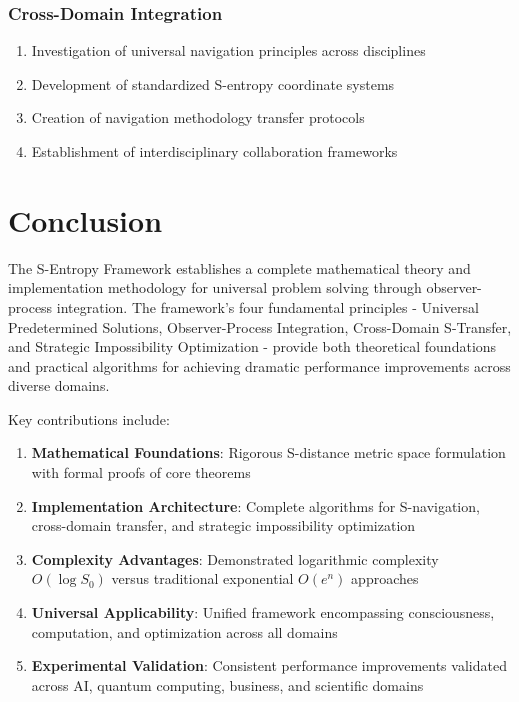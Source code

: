 \documentclass[11pt]{article}
\theoremstyle{definition}
\theoremstyle{remark}
\begin{document}
\subsubsection{Cross-Domain Integration}

\begin{enumerate}
\item Investigation of universal navigation principles across disciplines
\item Development of standardized S-entropy coordinate systems
\item Creation of navigation methodology transfer protocols
\item Establishment of interdisciplinary collaboration frameworks
\end{enumerate}

\section{Conclusion}

The S-Entropy Framework establishes a complete mathematical theory and implementation methodology for universal problem solving through observer-process integration. The framework's four fundamental principles - Universal Predetermined Solutions, Observer-Process Integration, Cross-Domain S-Transfer, and Strategic Impossibility Optimization - provide both theoretical foundations and practical algorithms for achieving dramatic performance improvements across diverse domains.

Key contributions include:

\begin{enumerate}
\item \textbf{Mathematical Foundations}: Rigorous S-distance metric space formulation with formal proofs of core theorems
\item \textbf{Implementation Architecture}: Complete algorithms for S-navigation, cross-domain transfer, and strategic impossibility optimization
\item \textbf{Complexity Advantages}: Demonstrated logarithmic complexity $O(\log S_0)$ versus traditional exponential $O(e^n)$ approaches
\item \textbf{Universal Applicability}: Unified framework encompassing consciousness, computation, and optimization across all domains
\item \textbf{Experimental Validation}: Consistent performance improvements validated across AI, quantum computing, business, and scientific domains
\end{enumerate}
\end{document}
